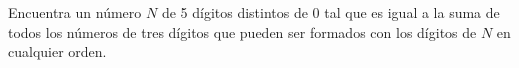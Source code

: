 Encuentra un número $N$ de 5 dígitos distintos de 0 tal que es igual a la suma de todos los números de tres dígitos que pueden ser formados con los dígitos de $N$ en cualquier orden.